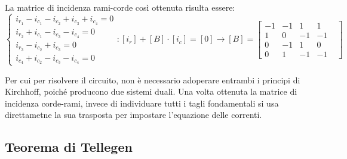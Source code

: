 \documentclass{article}
\numberwithin{equation}{subsection}
\begin{document}
La matrice di incidenza rami-corde così ottenuta risulta essere:
\begin{equation*}
    \begin{cases}
        i_{r_1}-i_{c_1}-i_{c_2}+i_{c_3}+i_{c_4}=0\\
        i_{r_2}+i_{c_1}-i_{c_3}-i_{c_4}=0\\
        i_{r_3}-i_{c_2}+i_{c_3}=0\\
        i_{c_4}+i_{c_2}-i_{c_3}-i_{c_4}=0
    \end{cases}:[i_r]+[B]\cdot[i_c]=[0]\to[B]=
    \begin{bmatrix}
        -1&-1&1&1\\
        1&0&-1&-1\\
        0&-1&1&0\\
        0&1&-1&-1&
    \end{bmatrix}
\end{equation*}

Per cui per risolvere il circuito, non è necessario adoperare entrambi i principi di Kirchhoff, poiché producono due sistemi duali. Una volta ottenuta la matrice di incidenza 
corde-rami, invece di individuare tutti i tagli fondamentali si usa direttametne la sua trasposta per impostare l'equazione delle correnti. 

\subsection{Teorema di Tellegen}
\end{document}
